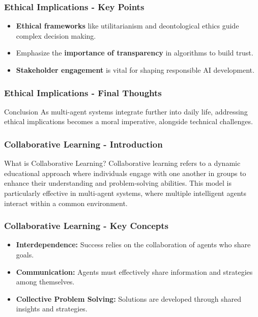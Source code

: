 \documentclass[aspectratio=169]{beamer}
\begin{document}
\begin{frame}[fragile]
    \frametitle{Ethical Implications - Key Points}
    \begin{itemize}
        \item \textbf{Ethical frameworks} like utilitarianism and deontological ethics guide complex decision making.
        \item Emphasize the \textbf{importance of transparency} in algorithms to build trust.
        \item \textbf{Stakeholder engagement} is vital for shaping responsible AI development.
    \end{itemize}
\end{frame}

\begin{frame}[fragile]
    \frametitle{Ethical Implications - Final Thoughts}
    \begin{block}{Conclusion}
        As multi-agent systems integrate further into daily life, addressing ethical implications becomes a moral imperative, alongside technical challenges.
    \end{block}
\end{frame}

\begin{frame}[fragile]
    \frametitle{Collaborative Learning - Introduction}
    \begin{block}{What is Collaborative Learning?}
        Collaborative learning refers to a dynamic educational approach where individuals engage with one another in groups to enhance their understanding and problem-solving abilities. This model is particularly effective in multi-agent systems, where multiple intelligent agents interact within a common environment.
    \end{block}
\end{frame}

\begin{frame}[fragile]
    \frametitle{Collaborative Learning - Key Concepts}
    \begin{itemize}
        \item \textbf{Interdependence:} Success relies on the collaboration of agents who share goals.
        \item \textbf{Communication:} Agents must effectively share information and strategies among themselves.
        \item \textbf{Collective Problem Solving:} Solutions are developed through shared insights and strategies.
    \end{itemize}
\end{frame}
\end{document}
